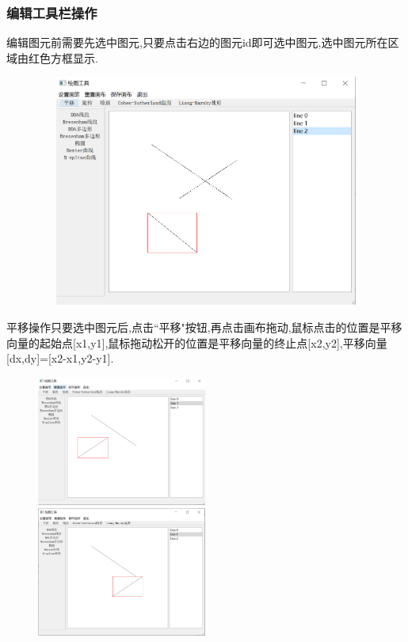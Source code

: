 \documentclass[a4paper,UTF8]{article}
\theoremstyle{definition}
\begin{document}
\subsubsection{编辑工具栏操作}
编辑图元前需要先选中图元,只要点击右边的图元id即可选中图元,选中图元所在区域由红色方框显示.
\begin{figure}[H]
	\includegraphics[width=5in,height=3in]{choose.png}
\end{figure}
平移操作只要选中图元后,点击``平移"按钮,再点击画布拖动,鼠标点击的位置是平移向量的起始点[x1,y1],鼠标拖动松开的位置是平移向量的终止点[x2,y2],平移向量[dx,dy]=[x2-x1,y2-y1].
\begin{figure}[H]
	\centering
	\begin{minipage}[t]{0.5\linewidth}
		\includegraphics[width=2.2in]{translate1.png}
	\end{minipage}%
	\begin{minipage}[t]{0.5\linewidth}
		\includegraphics[width=2.2in]{translate2.png}
	\end{minipage}
\end{figure}
\end{document}
